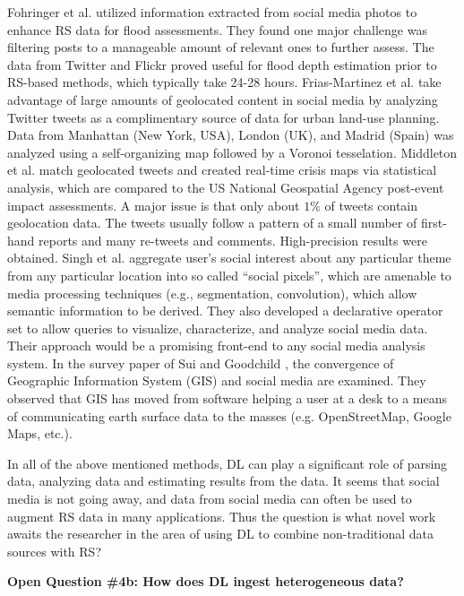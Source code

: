 \documentclass[12pt]{spieman}
\newcommand{\ParSection}[1]{}
\begin{document}
\begin{spacing}{1}
Fohringer et al. \cite{Fohringer2015NonTraditional} utilized information extracted from social media photos to enhance RS data for flood assessments. They found one major challenge was filtering posts to a manageable amount of relevant ones to further assess. The data from Twitter and Flickr proved useful for flood depth estimation prior to RS-based methods, which typically take 24-28 hours. Frias-Martinez et al. \cite{Frias-Martinez2014Spectral} take advantage of large amounts of geolocated content in social media by analyzing Twitter tweets as a complimentary source of data for urban land-use planning. Data from Manhattan (New York, USA), London (UK), and Madrid (Spain) was analyzed using a self-organizing map \cite{kohonen1998self} followed by a Voronoi tesselation. Middleton et al. \cite{middleton2014real} match geolocated tweets and created real-time crisis maps via statistical analysis, which are compared to the US National Geospatial Agency post-event impact assessments. A major issue is that only about $1\%$ of tweets contain geolocation data. The tweets usually follow a pattern of a small number of first-hand reports and many re-tweets and comments. High-precision results were obtained. Singh et al. \cite{Singh2010Social} aggregate user's social interest about any particular theme from any particular location into so called ``social pixels'', which are amenable to media processing techniques (e.g., segmentation, convolution), which allow semantic information to be derived. They also developed a declarative operator set to allow queries to visualize, characterize, and analyze social media data. Their approach would be a promising front-end to any social media analysis system. In the survey paper of Sui and Goodchild \cite{Sui2011Convergence} , the convergence of Geographic Information System (GIS) and social media are examined. They observed that GIS has moved from software helping a user at a desk to a means of communicating earth surface data to the masses (e.g. OpenStreetMap, Google Maps, etc.).

In all of the above mentioned methods, DL can play a significant role of parsing data, analyzing data and estimating results from the data. It seems that social media is not going away, and data from social media can often be used to augment RS data in many applications. Thus the question is what novel work awaits the researcher in the area of using DL to combine non-traditional data sources with RS?

\ParSection{Data Fusion}
\textbf{Open Question \#4b: How does DL ingest heterogeneous data?} 


\end{spacing}
\end{document}
